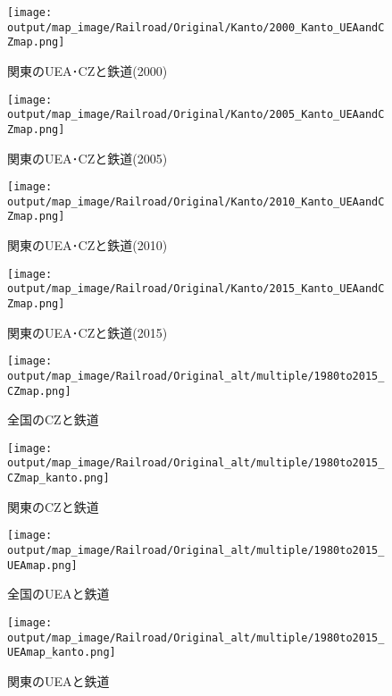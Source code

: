 \documentclass{ltjsarticle}
\begin{document}
\begin{figure}[pbth]
  \centering
  \texttt{[image: output/map\_image/Railroad/Original/Kanto/2000\_Kanto\_UEAandCZmap.png]}
  \caption{\label{2000:KanCZandUEA:Rail}関東のUEA･CZと鉄道(2000)}
\end{figure}


\begin{figure}[pbth]
  \centering
  \texttt{[image: output/map\_image/Railroad/Original/Kanto/2005\_Kanto\_UEAandCZmap.png]}
  \caption{\label{2005:KanCZandUEA:Rail}関東のUEA･CZと鉄道(2005)}
\end{figure}


\begin{figure}[pbth]
  \centering
  \texttt{[image: output/map\_image/Railroad/Original/Kanto/2010\_Kanto\_UEAandCZmap.png]}
  \caption{\label{2010:KanCZandUEA:Rail}関東のUEA･CZと鉄道(2010)}
\end{figure}


\begin{figure}[pbth]
  \centering
  \texttt{[image: output/map\_image/Railroad/Original/Kanto/2015\_Kanto\_UEAandCZmap.png]}
  \caption{\label{2015:KanCZandUEA:Rail}関東のUEA･CZと鉄道(2015)}
\end{figure}

\clearpage

\begin{figure}[pbth]
  \centering
  \texttt{[image: output/map\_image/Railroad/Original\_alt/multiple/1980to2015\_CZmap.png]}
  \caption{\label{alt:allCZandRail}全国のCZと鉄道}
\end{figure}

\begin{figure}[pbth]
  \centering
  \texttt{[image: output/map\_image/Railroad/Original\_alt/multiple/1980to2015\_CZmap\_kanto.png]}
  \caption{\label{alt:KanCZandRail}関東のCZと鉄道}
\end{figure}


\begin{figure}[pbth]
  \centering
  \texttt{[image: output/map\_image/Railroad/Original\_alt/multiple/1980to2015\_UEAmap.png]}
  \caption{\label{alt:allUEAandRail}全国のUEAと鉄道}
\end{figure}


\begin{figure}[pbth]
  \centering
  \texttt{[image: output/map\_image/Railroad/Original\_alt/multiple/1980to2015\_UEAmap\_kanto.png]}
  \caption{\label{alt:KanUEAandRail}関東のUEAと鉄道}
\end{figure}
\end{document}
